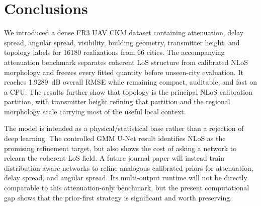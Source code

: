 \documentclass[10pt,conference,letterpaper]{IEEEtran}
\begin{document}
\section{Conclusions}\label{sec:conclusions}
We introduced a dense FR3 UAV CKM dataset containing attenuation, delay
spread, angular spread, visibility, building geometry, transmitter height, and
topology labels for 16180 realizations from 66 cities. The accompanying
attenuation benchmark separates coherent LoS structure from calibrated NLoS
morphology and freezes every fitted quantity before unseen-city evaluation.
It reaches \SI{1.9289}{dB} overall RMSE while remaining compact, auditable, and
fast on a CPU. The results further show that topology is the principal NLoS
calibration partition, with transmitter height refining that partition and
the regional morphology scale carrying most of the useful local context.

The model is intended as a physical/statistical base rather than a rejection
of deep learning. The controlled GMM U-Net result identifies NLoS as the
promising refinement target, but also shows the cost of asking a network to
relearn the coherent LoS field. A future journal paper will instead train
distribution-aware networks to refine analogous calibrated priors for
attenuation, delay spread, and angular spread. Its multi-output runtime will
not be directly comparable to this attenuation-only benchmark, but the present
computational gap shows that the prior-first strategy is significant and worth
preserving.



\end{document}
